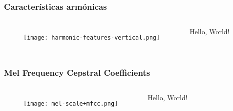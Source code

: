\begin{frame}
    \frametitle{Características armónicas}

    \begin{columns}

        \begin{figure}[!h]
            \centering
            \texttt{[image: harmonic-features-vertical.png]}
        \end{figure}


        Hello, World!

    \end{columns}
\end{frame}

\begin{frame}
    \frametitle{Mel Frequency Cepstral Coefficients}

    \begin{columns}

        \begin{figure}[!h]
            \centering
            \texttt{[image: mel-scale+mfcc.png]}
        \end{figure}


        Hello, World!

    \end{columns}
\end{frame}